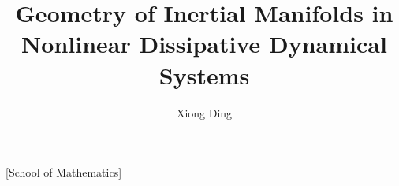 

\usepackage{ifthen}
\usepackage{tikz}
\usetikzlibrary{calc}
\usetikzlibrary{decorations.pathreplacing}

\usepackage{bm}
\usepackage{array}

\graphicspath{{../../figs/}{../figures/}{../../dimension/}{../../schur/figs/}}

\newcommand{\edit}[1]{{\color{blue} #1}}
\newcommand{\nssp}{u}
\newcommand{\sspRedM}{\sspRed^{(-)}}
\renewcommand{\ssp}{u}
\renewcommand{\zeit}{t}
\renewcommand{\jEigvec}[1][]{\ensuremath{{\bf e}_{#1}}} %
\renewcommand{\jEigvecT}[1][]{\ensuremath{{\bf e}_{#1}^\top}} %
\newcommand{\jEigvecRed}[1][]{\ensuremath{\hat{{\bf e}}_{#1}}}

\renewcommand{\RPO}[1]{\ensuremath{\overline{rpo}_{#1}}} %
\renewcommand{\trDiscr}[2]{C_{#1}^{#2}}
\renewcommand{\Lg}{\ensuremath{\mathbf{T}}}
\renewcommand{\exampl}[2]{
  \vskip -13mm
    \begin{exmple}
      \noindent\small
      \textsf{\textbf{#1}} ~
      \slshape\sffamily{#2}
    \end{exmple}
  \vskip -1mm
}

\DeclareMathOperator{\im}{Im}
\DeclareMathOperator{\re}{Re}
\DeclareMathOperator{\diag}{Diag}
\DeclareMathOperator{\dist}{dist}
\DeclareMathOperator{\const}{const}

\title{Geometry of Inertial Manifolds in
  Nonlinear Dissipative Dynamical Systems}
\author{Xiong Ding}

[School of Mathematics]

